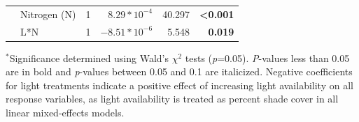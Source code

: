 \begin{table}[]
\begin{tabular}{p{0.1cm}p{2.5cm}p{0.5cm}p{1.75cm}p{1.5cm}p{1.5cm}}
         & Nitrogen (N)
         & \multicolumn{1}{r}{1} 
         & \multicolumn{1}{r}{$8.29*10^{-4}$}    & \multicolumn{1}{r}{40.297}    & \multicolumn{1}{r}{\textbf{<0.001}}
         \\
         
         & L*N
         & \multicolumn{1}{r}{1}            
         & \multicolumn{1}{r}{$-8.51*10^{-6}$}     & \multicolumn{1}{r}{5.548}     & \multicolumn{1}{r}{\textbf{0.019}} \\
         \hline

        \end{tabular}%
    \end{table}
\begin{singlespace}
    \noindent $^*$Significance determined using Wald’s $\chi^2$ tests (\textit{p}=0.05). \textit{P}-values less than 0.05 are in bold and \textit{p}-values between 0.05 and 0.1 are italicized. Negative coefficients for light treatments indicate a positive effect of increasing light availability on all response variables, as light availability is treated as percent shade cover in all linear mixed-effects models.
\end{singlespace}
\clearpage

